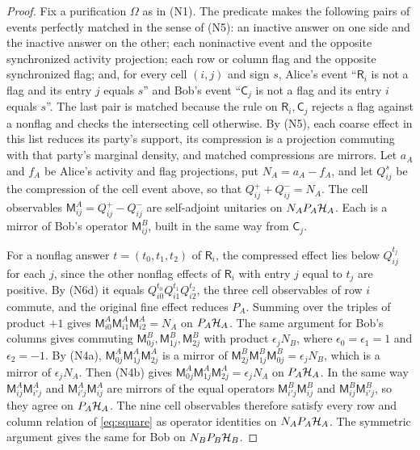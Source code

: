 \begin{proof}
Fix a purification $\Omega$ as in (N1). The predicate makes the following pairs of events perfectly matched in the sense of (N5): an inactive answer on one side and the inactive answer on the other; each noninactive event and the opposite synchronized activity projection; each row or column flag and the opposite synchronized flag; and, for every cell $(i,j)$ and sign $s$, Alice's event ``$\mathsf R_i$ is not a flag and its entry $j$ equals $s$'' and Bob's event ``$\mathsf C_j$ is not a flag and its entry $i$ equals $s$''. The last pair is matched because the rule on $\mathsf R_i,\mathsf C_j$ rejects a flag against a nonflag and checks the intersecting cell otherwise. By (N5), each coarse effect in this list reduces its party's support, its compression is a projection commuting with that party's marginal density, and matched compressions are mirrors. Let $a_A$ and $f_A$ be Alice's activity and flag projections, put $N_A=a_A-f_A$, and let $Q^s_{ij}$ be the compression of the cell event above, so that $Q^+_{ij}+Q^-_{ij}=N_A$. The cell observables $\mathsf M^A_{ij}=Q^+_{ij}-Q^-_{ij}$ are self-adjoint unitaries on $N_AP_A\mathcal H_A$. Each is a mirror of Bob's operator $\mathsf M^B_{ij}$, built in the same way from $\mathsf C_j$.

For a nonflag answer $t=(t_0,t_1,t_2)$ of $\mathsf R_i$, the compressed effect lies below $Q^{t_j}_{ij}$ for each $j$, since the other nonflag effects of $\mathsf R_i$ with entry $j$ equal to $t_j$ are positive. By (N6d) it equals $Q^{t_0}_{i0}Q^{t_1}_{i1}Q^{t_2}_{i2}$, the three cell observables of row $i$ commute, and the original fine effect reduces $P_A$. Summing over the triples of product $+1$ gives $\mathsf M^A_{i0}\mathsf M^A_{i1}\mathsf M^A_{i2}=N_A$ on $P_A\mathcal H_A$. The same argument for Bob's columns gives commuting $\mathsf M^B_{0j},\mathsf M^B_{1j},\mathsf M^B_{2j}$ with product $\epsilon_jN_B$, where $\epsilon_0=\epsilon_1=1$ and $\epsilon_2=-1$. By (N4a), $\mathsf M^A_{0j}\mathsf M^A_{1j}\mathsf M^A_{2j}$ is a mirror of $\mathsf M^B_{2j}\mathsf M^B_{1j}\mathsf M^B_{0j}=\epsilon_jN_B$, which is a mirror of $\epsilon_jN_A$. Then (N4b) gives $\mathsf M^A_{0j}\mathsf M^A_{1j}\mathsf M^A_{2j}=\epsilon_jN_A$ on $P_A\mathcal H_A$. In the same way $\mathsf M^A_{ij}\mathsf M^A_{i'j}$ and $\mathsf M^A_{i'j}\mathsf M^A_{ij}$ are mirrors of the equal operators $\mathsf M^B_{i'j}\mathsf M^B_{ij}$ and $\mathsf M^B_{ij}\mathsf M^B_{i'j}$, so they agree on $P_A\mathcal H_A$. The nine cell observables therefore satisfy every row and column relation of \eqref{eq:square} as operator identities on $N_AP_A\mathcal H_A$. The symmetric argument gives the same for Bob on $N_BP_B\mathcal H_B$.


\end{proof}
